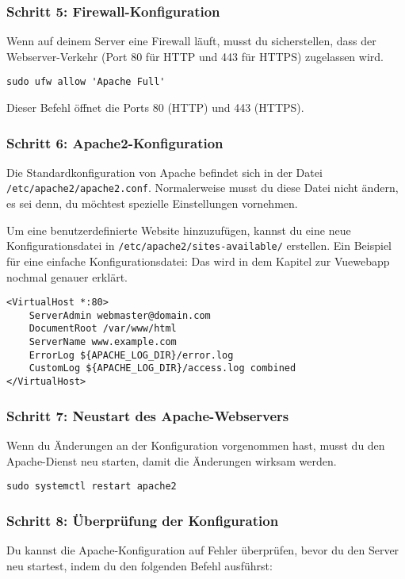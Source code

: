 \documentclass[a4paper,12pt]{article}
\begin{document}
\subsubsection{Schritt 5: Firewall-Konfiguration}
Wenn auf deinem Server eine Firewall läuft, musst du sicherstellen, dass der Webserver-Verkehr (Port 80 für HTTP und 443 für HTTPS) zugelassen wird.

\begin{lstlisting}
sudo ufw allow 'Apache Full'
\end{lstlisting}

Dieser Befehl öffnet die Ports 80 (HTTP) und 443 (HTTPS).

\subsubsection{Schritt 6: Apache2-Konfiguration}
Die Standardkonfiguration von Apache befindet sich in der Datei \texttt{/etc/apache2/apache2.conf}. Normalerweise musst du diese Datei nicht ändern, es sei denn, du möchtest spezielle Einstellungen vornehmen.

Um eine benutzerdefinierte Website hinzuzufügen, kannst du eine neue Konfigurationsdatei in \texttt{/etc/apache2/sites-available/} erstellen. Ein Beispiel für eine einfache Konfigurationsdatei:
Das wird in dem Kapitel zur Vuewebapp nochmal genauer erklärt.
\begin{lstlisting}
<VirtualHost *:80>
    ServerAdmin webmaster@domain.com
    DocumentRoot /var/www/html
    ServerName www.example.com
    ErrorLog ${APACHE_LOG_DIR}/error.log
    CustomLog ${APACHE_LOG_DIR}/access.log combined
</VirtualHost>
\end{lstlisting}

\subsubsection{Schritt 7: Neustart des Apache-Webservers}
Wenn du Änderungen an der Konfiguration vorgenommen hast, musst du den Apache-Dienst neu starten, damit die Änderungen wirksam werden.

\begin{lstlisting}
sudo systemctl restart apache2
\end{lstlisting}

\subsubsection{Schritt 8: Überprüfung der Konfiguration}
Du kannst die Apache-Konfiguration auf Fehler überprüfen, bevor du den Server neu startest, indem du den folgenden Befehl ausführst:
\end{document}
